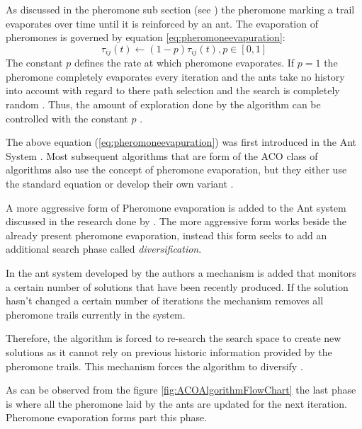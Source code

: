 As discussed in the pheromone sub section (see \pageref{sec:pheromonetrail}) the pheromone marking a trail evaporates over time until it is reinforced by an ant. The evaporation of pheromones is governed by equation \ref{eq:pheromoneevapuration}\cite{CompuIntelligenceIntro,AntsAndStigmergy,AntIntroTrends,AntSurvey}:
\begin{equation}
\label{eq:pheromoneevapuration}
	\tau_{ij}(t) \leftarrow (1-p)\tau_{ij}(t), p\in [0,1]
\end{equation}
The constant $p$ defines the rate at which pheromone evaporates. If $p=1$ the pheromone completely evaporates every iteration and the ants take no history into account with regard to there path selection and the search is completely random \cite{CompuIntelligenceIntro,AntsAndStigmergy}. Thus, the amount of exploration done by the algorithm can be controlled with the constant $p$ \cite{CompuIntelligenceIntro,AntsAndStigmergy}.

The above equation (\ref{eq:pheromoneevapuration}) was first introduced in the Ant System \cite{CompuIntelligenceIntro,AntsAndStigmergy,AntIntroTrends,AntSurvey}. Most subsequent algorithms that are form of the ACO class of algorithms also use the concept of pheromone evaporation, but they either use the standard equation or develop their own variant \cite{CompuIntelligenceIntro,AntsAndStigmergy,AntIntroTrends,AntSurvey}.

A more aggressive form of Pheromone evaporation  is added to the Ant system discussed in the research done by \cite{AntQAP}. The more aggressive form works beside the already present pheromone evaporation, instead this form seeks to add an additional search phase called \emph{diversification}. 

In the ant system developed by the authors a mechanism is added that monitors a certain number of solutions that have been recently produced. If the solution hasn't changed a certain number of iterations the mechanism removes all pheromone trails currently in the system. 

Therefore, the algorithm is forced to re-search the search space to create new solutions as it cannot rely on previous historic information provided by the pheromone trails. This mechanism forces the algorithm to diversify \cite{AntQAP}.

As can be observed from the figure \ref{fig:ACOAlgorithmFlowChart} the last phase is where all the pheromone laid by the ants are updated for the next iteration. Pheromone evaporation forms part this phase.
